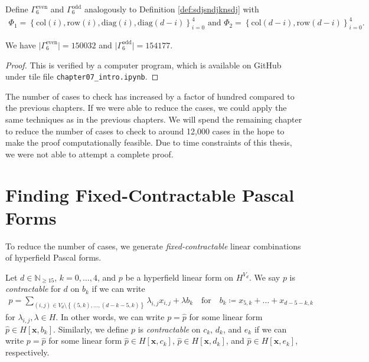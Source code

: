 \begin{definition}
    Define \(  \Gamma^{\mathrm{even}}_6 \) and \( \Gamma^{\mathrm{odd}}_6 \) analogously to Definition \ref{def:sdjsndjknsdj} with 
    \begin{gather*}
        \Phi_1 = \left\{ \mathrm{col}(i), \mathrm{row}(i), \mathrm{diag}(i), \mathrm{diag}(d-i) \right\}_{i=0}^4 \text{ and } \Phi_2 = \left\{ \mathrm{col}(d-i), \mathrm{row}(d-i) \right\}_{i=0}^4.
    \end{gather*}
\end{definition}

\begin{proposition}
    We have \( \lvert \Gamma^{\mathrm{even}}_6 \rvert  = 150032\) and \( \lvert \Gamma^{\mathrm{odd}}_6 \rvert  = 154177\).
\end{proposition}

\begin{proof}
    This is verified by a computer program, which is available on GitHub \cite{ducrepo} under tile file \texttt{chapter07\_intro.ipynb}.
\end{proof}

The number of cases to check has increased by a factor of hundred compared to the previous chapters. If we were able to reduce the cases, we could apply the same techniques as in the previous chapters. We will spend the remaining chapter to reduce the number of cases to check to around 12,000 cases in the hope to make the proof computationally feasible. Due to time constraints of this thesis, we were not able to attempt a complete proof.

\section{Finding Fixed-Contractable Pascal Forms}

To reduce the number of cases, we generate \emph{fixed-contractable} linear combinations of hyperfield Pascal forms.

\begin{definition}
    Let \( d \in \mathbb{N}_{\geq 15} \), \( k = 0, \dots ,4 \), and \( p \) be a hyperfield linear form on \( H^{V_d} \). We say \( p \) is \emph{contractable} for \( d \) on \( b_k \) if we can write
    \begin{align*}
        p = \sum_{(i,j) \in V_d \setminus \left\{ (5,k), \dots, (d-k-5, k) \right\}} \lambda_{i,j} x_{i,j}  +\lambda b_k \quad \text{for} \quad b_k \coloneqq x_{5,k} + \dots + x_{d-5-k,k}
    \end{align*}
    for \( \lambda_{i,j}, \lambda \in H \). In other words, we can write \( p = \hat p \) for some linear form \( \hat p \in H[\mathbf{x}, b_k] \). 
    Similarly, we define \( p \) is \emph{contractable} on \( c_k \), \( d_k \), and \( e_k \) if we can write \( p = \hat p \) for some linear form \( \hat p \in H[\mathbf{x}, c_k] \), \( \hat p \in H[\mathbf{x}, d_k] \), and \( \hat p \in H[\mathbf{x}, e_k] \), respectively.
\end{definition}

